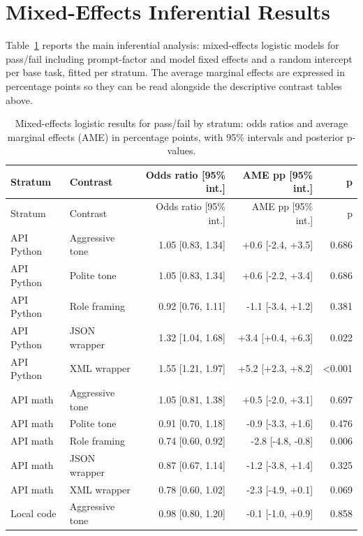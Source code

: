 \section{Mixed-Effects Inferential Results\label{sec:mixed-effects-results}}

Table~\ref{tab:mixed-effects-pass} reports the main inferential analysis: mixed-effects logistic models for pass/fail including prompt-factor and model fixed effects and a random intercept per base task, fitted per stratum. The average marginal effects are expressed in percentage points so they can be read alongside the descriptive contrast tables above.

{\small
\setlength{\tabcolsep}{4pt}
\begin{longtable}[]{@{}llrrr@{}}
\caption{Mixed-effects logistic results for pass/fail by stratum: odds ratios and average marginal effects (AME) in percentage points, with 95\% intervals and posterior p-values.}\label{tab:mixed-effects-pass}\tabularnewline
\toprule\noalign{}
Stratum & Contrast & Odds ratio [95\% int.] & AME pp [95\% int.] & p \\
\midrule\noalign{}
\endfirsthead
\toprule\noalign{}
Stratum & Contrast & Odds ratio [95\% int.] & AME pp [95\% int.] & p \\
\midrule\noalign{}
\endhead
\bottomrule\noalign{}
\endlastfoot
API Python & Aggressive tone & 1.05 [0.83, 1.34] & +0.6 [-2.4, +3.5] & 0.686 \\
API Python & Polite tone & 1.05 [0.83, 1.34] & +0.6 [-2.2, +3.4] & 0.686 \\
API Python & Role framing & 0.92 [0.76, 1.11] & -1.1 [-3.4, +1.2] & 0.381 \\
API Python & JSON wrapper & 1.32 [1.04, 1.68] & +3.4 [+0.4, +6.3] & 0.022 \\
API Python & XML wrapper & 1.55 [1.21, 1.97] & +5.2 [+2.3, +8.2] & \textless{}0.001 \\
API math & Aggressive tone & 1.05 [0.81, 1.38] & +0.5 [-2.0, +3.1] & 0.697 \\
API math & Polite tone & 0.91 [0.70, 1.18] & -0.9 [-3.3, +1.6] & 0.476 \\
API math & Role framing & 0.74 [0.60, 0.92] & -2.8 [-4.8, -0.8] & 0.006 \\
API math & JSON wrapper & 0.87 [0.67, 1.14] & -1.2 [-3.8, +1.4] & 0.325 \\
API math & XML wrapper & 0.78 [0.60, 1.02] & -2.3 [-4.9, +0.1] & 0.069 \\
Local code & Aggressive tone & 0.98 [0.80, 1.20] & -0.1 [-1.0, +0.9] & 0.858 \\

\end{longtable}}
